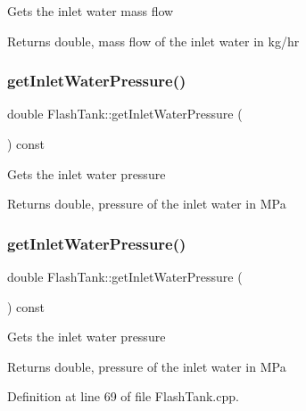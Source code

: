 Gets the inlet water mass flow \begin{DoxyReturn}{Returns}
double, mass flow of the inlet water in kg/hr 
\end{DoxyReturn}
\mbox{\label{class_flash_tank_a62e8ff97d91da0845526c494022e41da}} 
\subsubsection{\texorpdfstring{get\+Inlet\+Water\+Pressure()}{getInletWaterPressure()}\hspace{0.1cm}{\footnotesize\ttfamily [1/3]}}
{\footnotesize\ttfamily double Flash\+Tank\+::get\+Inlet\+Water\+Pressure (\begin{DoxyParamCaption}{ }\end{DoxyParamCaption}) const}

Gets the inlet water pressure \begin{DoxyReturn}{Returns}
double, pressure of the inlet water in M\+Pa 
\end{DoxyReturn}
\mbox{\label{class_flash_tank_a62e8ff97d91da0845526c494022e41da}} 
\subsubsection{\texorpdfstring{get\+Inlet\+Water\+Pressure()}{getInletWaterPressure()}\hspace{0.1cm}{\footnotesize\ttfamily [2/3]}}
{\footnotesize\ttfamily double Flash\+Tank\+::get\+Inlet\+Water\+Pressure (\begin{DoxyParamCaption}{ }\end{DoxyParamCaption}) const}

Gets the inlet water pressure \begin{DoxyReturn}{Returns}
double, pressure of the inlet water in M\+Pa 
\end{DoxyReturn}


Definition at line 69 of file Flash\+Tank.\+cpp.

\mbox{\label{class_flash_tank_a62e8ff97d91da0845526c494022e41da}} 
